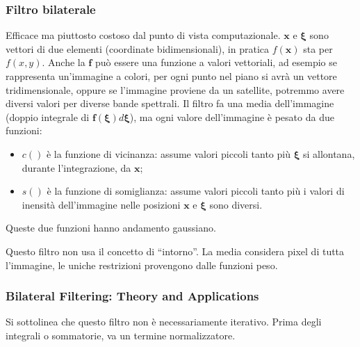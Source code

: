 \documentclass[a4paper,11pt]{article}
\begin{document}
\subsubsection{Filtro bilaterale}
Efficace ma piuttosto costoso dal punto di vista computazionale.
$\bm{x}$ e $\bm{\xi}$ sono vettori di due elementi (coordinate bidimensionali), in pratica $f(\bm{x})$ sta per $f(x,y)$.
Anche la $\bm{f}$ può essere una funzione a valori vettoriali, ad esempio se rappresenta un'immagine a colori, per ogni punto nel piano
si avrà un vettore tridimensionale, oppure se l'immagine proviene da un satellite, potremmo avere diversi valori per diverse bande spettrali.
Il filtro fa una media dell'immagine (doppio integrale di $\bm{f}(\bm{\xi})d\bm{\xi}$), ma ogni valore dell'immagine è pesato da due funzioni:
\begin{itemize}
    \item $c()$ è la funzione di vicinanza: assume valori piccoli tanto più $\bm{\xi}$ si allontana, durante l'integrazione, da $\bm{x}$;
    \item $s()$ è la funzione di somiglianza: assume valori piccoli tanto più i valori di inensità dell'immagine nelle posizioni $\bm{x}$ e $\bm{\xi}$ sono
    diversi.
\end{itemize}
Queste due funzioni hanno andamento gaussiano.
\par
Questo filtro non usa il concetto di ``intorno''. La media considera pixel di tutta l'immagine, le uniche restrizioni provengono dalle funzioni peso.

\subsubsection{Bilateral Filtering: Theory and Applications}
Si sottolinea che questo filtro non è necessariamente iterativo. Prima degli integrali o sommatorie, va un termine normalizzatore.
\end{document}
